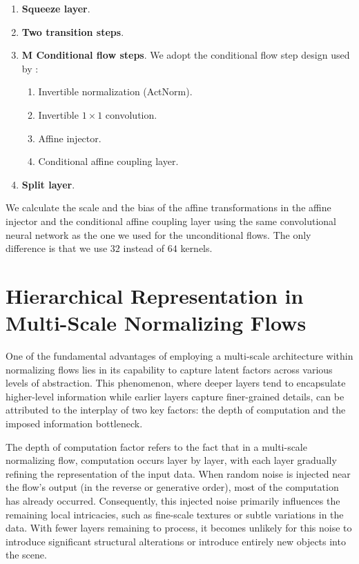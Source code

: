 \begin{enumerate}
    \item \textbf{Squeeze layer}.
    \item \textbf{Two transition steps}.
    \item \textbf{M Conditional flow steps}. We adopt the conditional flow step design used by \cite{SRFLOW}: \begin{enumerate}
        \item Invertible normalization (ActNorm).
        \item Invertible $1\times 1$ convolution.
        \item Affine injector.
        \item Conditional affine coupling layer.
    \end{enumerate}
    \item \textbf{Split layer}.
\end{enumerate}


We calculate the scale and the bias of the affine transformations in the affine injector and the conditional affine coupling layer using the same convolutional neural network as the one we used for the unconditional flows. The only difference is that we use $32$ instead of $64$ kernels.

\newpage

\section{Hierarchical Representation in Multi-Scale Normalizing Flows}\label{ch1:Hierarchical-Representation-in-Multi-Scale-Normalizing-Flows}

One of the fundamental advantages of employing a multi-scale architecture within normalizing flows lies in its capability to capture latent factors across various levels of abstraction. This phenomenon, where deeper layers tend to encapsulate higher-level information while earlier layers capture finer-grained details, can be attributed to the interplay of two key factors: the depth of computation and the imposed information bottleneck.

The depth of computation factor refers to the fact that in a multi-scale normalizing flow, computation occurs layer by layer, with each layer gradually refining the representation of the input data. When random noise is injected near the flow's output (in the reverse or generative order), most of the computation has already occurred. Consequently, this injected noise primarily influences the remaining local intricacies, such as fine-scale textures or subtle variations in the data. With fewer layers remaining to process, it becomes unlikely for this noise to introduce significant structural alterations or introduce entirely new objects into the scene.

